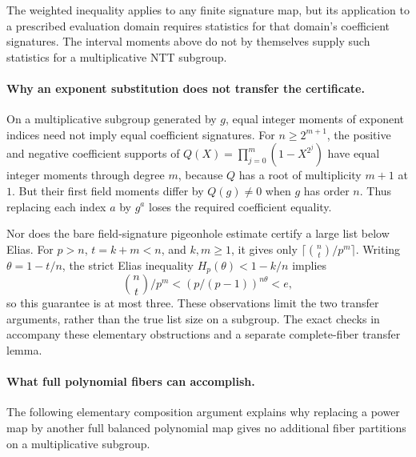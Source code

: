 \documentclass[11pt,letterpaper]{article}
\theoremstyle{definition}
\theoremstyle{remark}
\begin{document}
The weighted inequality applies to any finite signature map, but its
application to a prescribed evaluation domain requires statistics for
that domain's coefficient signatures. The interval moments above do not
by themselves supply such statistics for a multiplicative NTT subgroup.

\paragraph{Why an exponent substitution does not transfer the certificate.}
On a multiplicative subgroup generated by $g$, equal integer moments
of exponent indices need not imply equal coefficient signatures.
For $n\ge2^{m+1}$, the positive and negative coefficient supports of
$Q(X)=\prod_{j=0}^{m}(1-X^{2^j})$ have equal integer moments through
degree $m$, because $Q$ has a root of multiplicity $m+1$ at $1$.
But their first field moments differ by $Q(g)\ne0$ when $g$ has
order $n$. Thus replacing each index $a$ by $g^a$ loses the required
coefficient equality.

Nor does the bare field-signature pigeonhole estimate certify a large
list below Elias. For $p>n$, $t=k+m<n$, and $k,m\ge1$, it gives only
$\lceil\binom nt/p^m\rceil$. Writing $\theta=1-t/n$, the strict Elias
inequality $H_p(\theta)<1-k/n$ implies
\[
 \binom nt/p^m < (p/(p-1))^{n\theta}<e,
\]
so this guarantee is at most three. These observations limit the two
transfer arguments, rather than the true list size on a subgroup.
The exact checks in  accompany
these elementary obstructions and a separate complete-fiber transfer lemma.

\paragraph{What full polynomial fibers can accomplish.}
The following elementary composition argument explains why replacing
a power map by another full balanced polynomial map gives no additional
fiber partitions on a multiplicative subgroup.
\end{document}
